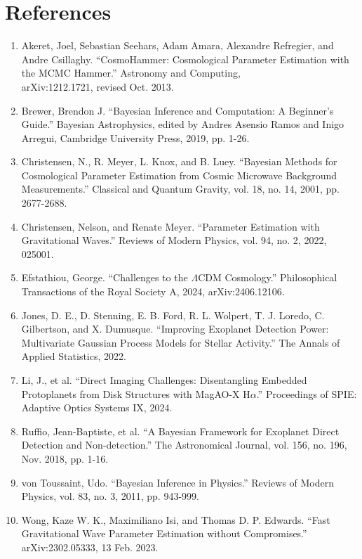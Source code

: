 \documentclass[12pt]{article}
\begin{document}
\section*{References}

\begin{enumerate}
  \item Akeret, Joel, Sebastian Seehars, Adam Amara, Alexandre Refregier, and Andre Csillaghy. “CosmoHammer: Cosmological Parameter Estimation with the MCMC Hammer.” Astronomy and Computing,\\arXiv:1212.1721, revised Oct. 2013.
  \item Brewer, Brendon J. “Bayesian Inference and Computation: A Beginner's Guide.” Bayesian Astrophysics, edited by Andres Asensio Ramos and Inigo Arregui, Cambridge University Press, 2019, pp. 1-26.
  \item Christensen, N., R. Meyer, L. Knox, and B. Luey. “Bayesian Methods for Cosmological Parameter Estimation from Cosmic Microwave Background Measurements.” Classical and Quantum Gravity, vol. 18, no. 14, 2001, pp. 2677-2688.
  \item Christensen, Nelson, and Renate Meyer. “Parameter Estimation with Gravitational Waves.” Reviews of Modern Physics, vol. 94, no. 2, 2022, 025001.
  \item Efstathiou, George. “Challenges to the $\Lambda$CDM Cosmology.” Philosophical Transactions of the Royal Society A, 2024, arXiv:2406.12106.
  \item Jones, D. E., D. Stenning, E. B. Ford, R. L. Wolpert, T. J. Loredo, C. Gilbertson, and X. Dumusque. “Improving Exoplanet Detection Power: Multivariate Gaussian Process Models for Stellar Activity.” The Annals of Applied Statistics, 2022.
  \item Li, J., et al. “Direct Imaging Challenges: Disentangling Embedded Protoplanets from Disk Structures with MagAO-X H$\alpha$.” Proceedings of SPIE: Adaptive Optics Systems IX, 2024.
  \item Ruffio, Jean-Baptiste, et al. “A Bayesian Framework for Exoplanet Direct Detection and Non-detection.” The Astronomical Journal, vol. 156, no. 196, Nov. 2018, pp. 1-16.
  \item von Toussaint, Udo. “Bayesian Inference in Physics.” Reviews of Modern Physics, vol. 83, no. 3, 2011, pp. 943-999.
  \item Wong, Kaze W. K., Maximiliano Isi, and Thomas D. P. Edwards. “Fast Gravitational Wave Parameter Estimation without Compromises.” \\arXiv:2302.05333, 13 Feb. 2023.
\end{enumerate}
\end{document}
